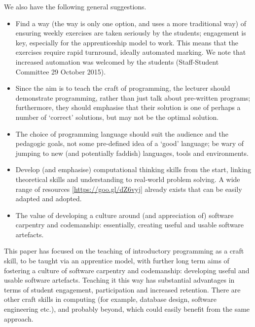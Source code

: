\documentclass[conference,compsoc]{IEEEtran}
\begin{document}
We also have the following general suggestions.
\begin{itemize}
	\item	Find a way (the \BathM{} way is only one option, and \BathC{} uses a more traditional way) of ensuring weekly exercises are taken seriously by the students; engagement is key, especially for the apprenticeship model to work. This means that the exercises require rapid turnround, ideally automated marking. We note that increased automation was welcomed by the \BathC{} students (Staff-Student Committee 29 October 2015).
	\item	Since the aim is to teach the craft of programming, the lecturer should demonstrate programming, rather than just talk about pre-written programs; furthermore, they should emphasise that their solution is one of perhaps a number of `correct' solutions, but may not be the optimal solution.
	\item	The choice of programming language should suit the audience and the pedagogic goals, not some pre-defined idea of a `good' language; be wary of jumping to new (and potentially faddish) languages, tools and environments.
	\item	Develop (and emphasise) computational thinking skills from the start, linking theoretical skills and understanding to real-world problem solving. A wide range of resources [\url{https://goo.gl/dZ6vyj}] already exists that can be easily adapted and adopted.
	\item	The value of developing a culture around (and appreciation of) software carpentry and codemanship: essentially, creating useful and usable software artefacts.
\end{itemize} 

This paper has focused on the teaching of introductory programming as
a craft skill, to be taught via an apprentice model, with further long
term aims of fostering a culture of software carpentry and
codemanship: developing useful and usable software artefacts. Teaching
it this way has substantial advantages in terms of student engagement,
participation and increased retention. There are other craft skills in
computing (for example, database design, software engineering etc.), and probably beyond, which could easily benefit from the same approach.
\end{document}
